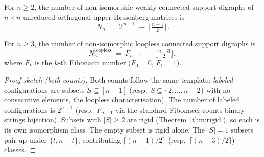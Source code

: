 \begin{theorem}\label{thm:count}
For $n \ge 2$, the number of non-isomorphic weakly connected support
digraphs of $n \times n$ unreduced orthogonal upper Hessenberg matrices is
\[
  N_n \;=\; 2^{\,n-1} \;-\; \Big\lfloor \tfrac{n-1}{2} \Big\rfloor.
\]
\end{theorem}

\begin{theorem}\label{thm:count-loopless}
For $n \ge 3$, the number of non-isomorphic loopless connected support
digraphs is
\[
  N_n^{\mathrm{loopless}} \;=\; F_{n-1} \;-\; \Big\lfloor \tfrac{n-3}{2} \Big\rfloor,
\]
where $F_k$ is the $k$-th Fibonacci number ($F_0 = 0$, $F_1 = 1$).
\end{theorem}

\begin{proof}[Proof sketch \textup{(both counts)}]
Both counts follow the same template: \emph{labeled} configurations are
subsets $S \subseteq [n-1]$ (resp.\ $S \subseteq \{2, \dots, n-2\}$ with
no consecutive elements, the loopless characterisation). The number of
labeled configurations is $2^{n-1}$ (resp.\ $F_{n-1}$ via the standard
Fibonacci-counts-binary-strings bijection). Subsets with $|S| \ge 2$ are
rigid (Theorem~\ref{thm:rigid}), so each is its own isomorphism class.
The empty subset is rigid alone. The $|S| = 1$ subsets pair up under
$\{t, n-t\}$, contributing $\lceil(n-1)/2\rceil$ (resp.\
$\lceil(n-3)/2\rceil$) classes.
\end{proof}

